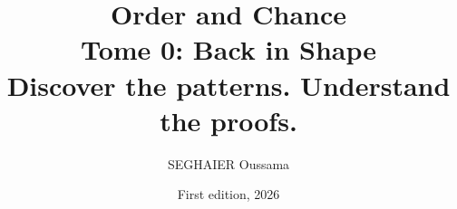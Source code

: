 \documentclass[11pt,openany]{book}
\title{\Huge\textbf{Order and Chance}\\[0.4em]\LARGE Tome 0: Back in Shape\\[0.6em]
\Large Discover the patterns. Understand the proofs.}
\author{SEGHAIER Oussama}
\date{First edition, 2026}
\theoremstyle{definition}
\theoremstyle{plain}
\begin{document}
\frontmatter
\makecover
\maketitle

\tableofcontents

\mainmatter










\backmatter


\end{document}
